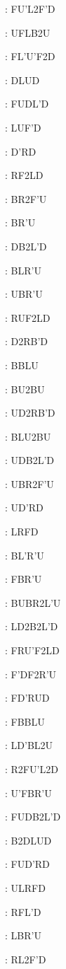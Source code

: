 \documentclass[9pt]{article}
\begin{document}
{\begin{multicols}{6}
: FU'L2F'D

: UFLB2U

: FL'U'F2D

: DLUD

: FUDL'D

: LUF'D

: D'RD

: RF2LD

: BR2F'U

: BR'U

: DB2L'D

: BLR'U

: UBR'U

: RUF2LD

: D2RB'D

: BBLU

: BU2BU

: UD2RB'D

: BLU2BU

: UDB2L'D

: UBR2F'U

: UD'RD

: LRFD

: BL'R'U

: FBR'U

: BUBR2L'U

: LD2B2L'D

: FRU'F2LD

: F'DF2R'U

: FD'RUD

: FBBLU

: LD'BL2U

: R2FU'L2D

: U'FBR'U

: FUDB2L'D

: B2DLUD

: FUD'RD

: ULRFD

: RFL'D

: LBR'U

: RL2F'D


\end{multicols}}
\end{document}
